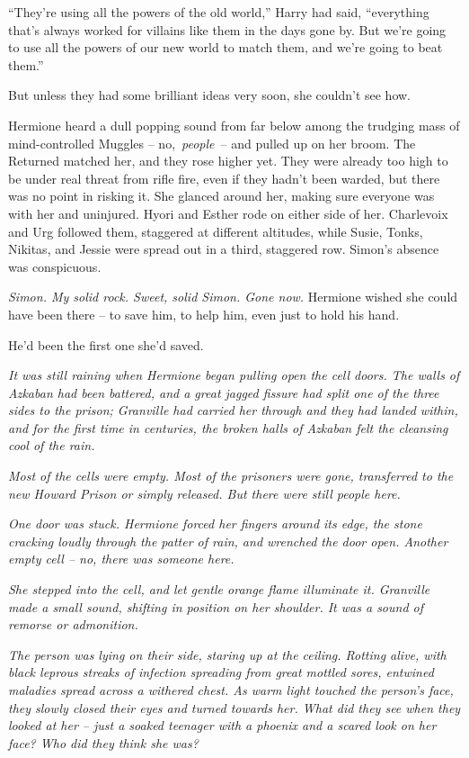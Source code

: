 ``They're using all the powers of the old world,'' Harry had said,
``everything that's always worked for villains like them in the days
gone by. But we're going to use all the powers of our new world to match
them, and we're going to beat them.''

But unless they had some brilliant ideas very soon, she couldn't see
how.

Hermione heard a dull popping sound from far below among the trudging
mass of mind-controlled Muggles -- no,~\emph{people}~-- and pulled up on
her broom. The Returned matched her, and they rose higher yet. They were
already too high to be under real threat from rifle fire, even if they
hadn't been warded, but there was no point in risking it. She glanced
around her, making sure everyone was with her and uninjured. Hyori and
Esther rode on either side of her. Charlevoix and Urg followed them,
staggered at different altitudes, while Susie, Tonks, Nikitas, and
Jessie were spread out in a third, staggered row. Simon's absence was
conspicuous.

\emph{Simon. My solid rock. Sweet, solid Simon. Gone now.} Hermione
wished she could have been there -- to save him, to help him, even just
to hold his hand.

He'd been the first one she'd saved.

\emph{It was still raining when Hermione began pulling open the cell
doors. The walls of Azkaban had been battered, and a great jagged
fissure had split one of the three sides to the prison; Granville had
carried her through and they had landed within, and for the first time
in centuries, the broken halls of Azkaban felt the cleansing cool of the
rain.}

\emph{Most of the cells were empty. Most of the prisoners were gone,
transferred to the new Howard Prison or simply released. But there were
still people here.}

\emph{One door was stuck. Hermione forced her fingers around its edge,
the stone cracking loudly through the patter of rain, and wrenched the
door open. Another empty cell -- no, there was someone here.}

\emph{She stepped into the cell, and let gentle orange flame illuminate
it. Granville made a small sound, shifting in position on her shoulder.
It was a sound of remorse or admonition.}

\emph{The person was lying on their side, staring up at the ceiling.
Rotting alive, with black leprous streaks of infection spreading from
great mottled sores, entwined maladies spread across a withered chest.
As warm light touched the person's face, they slowly closed their eyes
and turned towards her. What did they see when they looked at her --
just a soaked teenager with a phoenix and a scared look on her face? Who
did they think she was?}

